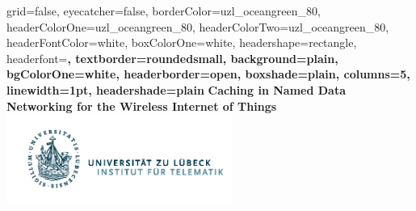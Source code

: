 \documentclass[a0paper,portrait]{baposter}
\begin{document}



\background{
}

\begin{poster}{
	grid=false,
	eyecatcher=false, 
	borderColor=uzl_oceangreen_80,
	headerColorOne=uzl_oceangreen_80,
	headerColorTwo=uzl_oceangreen_80,
	headerFontColor=white,
	boxColorOne=white,
	headershape=rectangle,
	headerfont=\large\bf,
	textborder=roundedsmall,
	background=plain,
	bgColorOne=white,
	headerborder=open,
	boxshade=plain,
	columns=5,
	linewidth=1pt,
	headershade=plain
}
{
}
{
	\vspace{0.3cm}
  \textcolor{uzl_oceangreen_80}{\textbf{Caching in Named Data Networking for the Wireless Internet of Things}}
    \vspace{0.3cm}
}
{
  \textcolor{uzl_orange_2}{\textsf{}}
}
{
  \hspace{1cm}
  \includegraphics[height=8em]{Logo_Inst_Telematik_orig}
}


\end{poster}
\end{document}
